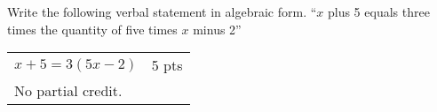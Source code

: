 

{
	Write the following verbal statement in algebraic form. ``$x$ plus 5 equals three times the quantity of five times $x$ minus 2''
}
{
	\begin{tabular}{l r}
	$x+5=3(5x-2)$ & 5 pts\\
	No partial credit.
	\end{tabular}
}

